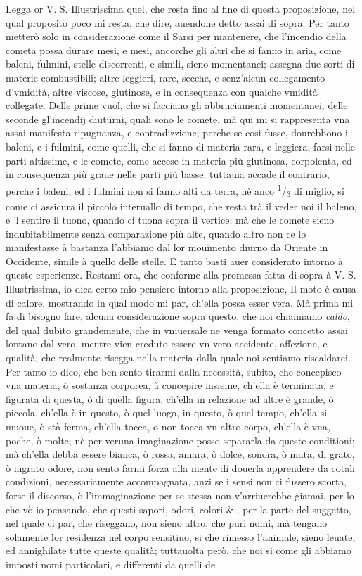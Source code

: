 \documentclass[11pt,twoside,openany]{book}
\begin{document}
Legga or V. S. Illustrissima quel, che resta fino al fine di questa proposizione, nel qual proposito poco mi resta, che dire, auendone detto assai di sopra. Per tanto metterò solo in considerazione come il Sarsi per mantenere, che l'incendio della cometa possa durare mesi, e mesi, ancorche gli altri che si fanno in aria, come baleni, fulmini, stelle discorrenti, e simili, sieno momentanei; assegna due sorti di materie combustibili; altre leggieri, rare, secche, e senz'alcun collegamento d'vmidità, altre viscose, glutinose, e in consequenza con qualche vmidità collegate. Delle prime vuol, che si facciano gli abbruciamenti momentanei; delle seconde gl'incendij diuturni, quali sono le comete, mà qui mi si rappresenta vna assai manifesta ripugnanza, e contradizzione; perche se così fusse, dourebbono i baleni, e i fulmini, come quelli, che si fanno di materia rara, e leggiera, farsi nelle parti altissime, e le comete, come accese in materia più glutinosa, corpolenta, ed in consequenza più graue nelle parti più basse; tuttauia accade il contrario, perche i baleni, ed i fulmini non si fanno alti da terra, nè anco \textsuperscript{1}/\textsubscript{3} di miglio, si come ci assicura il piccolo interuallo di tempo, che resta trà il veder noi il baleno, e 'l sentire il tuono, quando ci tuona sopra il vertice; mà che le comete sieno indubitabilmente senza comparazione più alte, quando altro non ce lo manifestasse à bastanza l'abbiamo dal lor mouimento diurno da Oriente in Occidente, simile à quello delle stelle. E tanto basti auer considerato intorno à queste esperienze. Restami ora, che conforme alla promessa fatta di sopra à V. S. Illustrissima, io dica certo mio pensiero intorno alla proposizione, Il moto è causa di calore, mostrando in qual modo mi par, ch'ella possa esser vera. Mà prima mi fa di bisogno fare, alcuna considerazione sopra questo, che noi chiamiamo \textit{caldo}, del qual dubito grandemente, che in vniuersale ne venga formato concetto assai lontano dal vero, mentre vien creduto essere vn vero accidente, affezione, e qualità, che realmente risegga nella materia dalla quale noi sentiamo riscaldarci. Per tanto io dico, che ben sento tirarmi dalla necessità, subito, che concepisco vna materia, ò sostanza corporea, à concepire insieme, ch'ella è terminata, e figurata di questa, ò di quella figura, ch'ella in relazione ad altre è grande, ò piccola, ch'ella è in questo, ò quel luogo, in questo, ò quel tempo, ch'ella si muoue, ò stà ferma, ch'ella tocca, o non tocca vn altro corpo, ch'ella è vna, poche, ò molte; nè per veruna imaginazione posso separarla da queste conditioni; mà ch'ella debba essere bianca, ò rossa, amara, ò dolce, sonora, ò muta, di grato, ò ingrato odore, non sento farmi forza alla mente di douerla apprendere da cotali condizioni, necessariamente accompagnata, anzi se i sensi non ci fussero scorta, forse il discorso, ò l'immaginazione per se stessa non v'arriuerebbe giamai, per lo che vò io pensando, che questi sapori, odori, colori \&., per la parte del suggetto, nel quale ci par, che riseggano, non sieno altro, che puri nomi, mà tengano solamente lor residenza nel corpo sensitiuo, si che rimesso l'animale, sieno leuate, ed annighilate tutte queste qualità; tuttauolta però, che noi si come gli abbiamo imposti nomi particolari, e differenti da quelli de 
\end{document}
